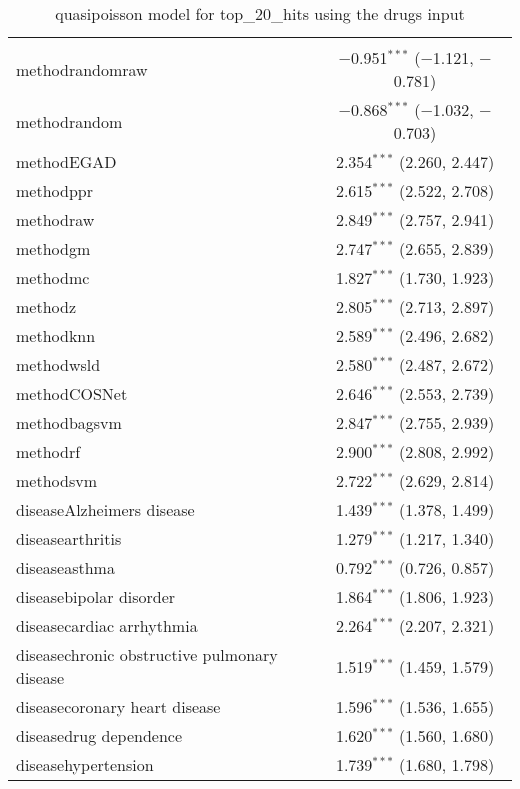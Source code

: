
\begin{table}[!htbp] \centering 
  \caption{quasipoisson model for top_20_hits using the drugs input} 
  \label{} 
\begin{tabular}{@{\extracolsep{5pt}}lc} 
\\[-1.8ex]\hline 
\hline \\[-1.8ex] 
 methodrandomraw & $-$0.951$^{***}$ ($-$1.121, $-$0.781) \\ 
  methodrandom & $-$0.868$^{***}$ ($-$1.032, $-$0.703) \\ 
  methodEGAD & 2.354$^{***}$ (2.260, 2.447) \\ 
  methodppr & 2.615$^{***}$ (2.522, 2.708) \\ 
  methodraw & 2.849$^{***}$ (2.757, 2.941) \\ 
  methodgm & 2.747$^{***}$ (2.655, 2.839) \\ 
  methodmc & 1.827$^{***}$ (1.730, 1.923) \\ 
  methodz & 2.805$^{***}$ (2.713, 2.897) \\ 
  methodknn & 2.589$^{***}$ (2.496, 2.682) \\ 
  methodwsld & 2.580$^{***}$ (2.487, 2.672) \\ 
  methodCOSNet & 2.646$^{***}$ (2.553, 2.739) \\ 
  methodbagsvm & 2.847$^{***}$ (2.755, 2.939) \\ 
  methodrf & 2.900$^{***}$ (2.808, 2.992) \\ 
  methodsvm & 2.722$^{***}$ (2.629, 2.814) \\ 
  diseaseAlzheimers disease & 1.439$^{***}$ (1.378, 1.499) \\ 
  diseasearthritis & 1.279$^{***}$ (1.217, 1.340) \\ 
  diseaseasthma & 0.792$^{***}$ (0.726, 0.857) \\ 
  diseasebipolar disorder & 1.864$^{***}$ (1.806, 1.923) \\ 
  diseasecardiac arrhythmia & 2.264$^{***}$ (2.207, 2.321) \\ 
  diseasechronic obstructive pulmonary disease & 1.519$^{***}$ (1.459, 1.579) \\ 
  diseasecoronary heart disease & 1.596$^{***}$ (1.536, 1.655) \\ 
  diseasedrug dependence & 1.620$^{***}$ (1.560, 1.680) \\ 
  diseasehypertension & 1.739$^{***}$ (1.680, 1.798) \\ 

\end{tabular}
\end{table}
